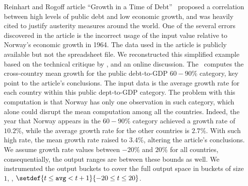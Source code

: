 Reinhart and Rogoff article ``Growth in a Time of Debt''~ proposed a correlation between high levels of public debt and low economic growth,
and %
was heavily cited to justify austerity measures around the world. %
One of the several errors discovered in the article is the incorrect usage of the input value relative to Norway's economic growth in 1964.
The data used in the article is publicly available but not the spreadsheet file. We reconstructed this simplified example based on
the technical critique by , and an online discussion.
The~
computes the cross-country mean growth for the public debt-to-GDP $60-90\%$ category, key point to the article's conclusions.
The input data is the average growth rate for each country within this public dept-to-GDP category. The problem with this computation is that Norway has only one observation in such category, which alone could disrupt the mean computation among all the countries. Indeed, the year that Norway appears in the $60-90\%$ category achieved a growth rate of $10.2\%$, while the average growth rate for the other countries is $2.7\%$.
With such high rate, the mean growth rate raised to $3.4\%$, altering the article's conclusions.
We assume growth rate values between $-20\%$ and $20\%$ for all countries, consequentially, the output ranges are between these bounds as well. We instrumented the output buckets to cover the full output space in buckets of size $1$, \ie, $\setdef{t \le \texttt{avg} < t + 1}{-20 \le t \le 20}$.
%
\newcommand{\dg}{60}
\newcommand{\x}{\texttt{angle}}
\newcommand{\y}{\texttt{speed}}


